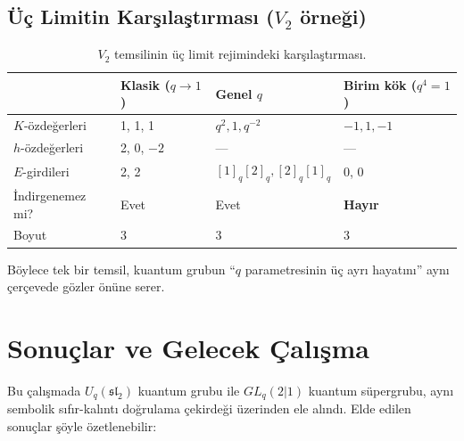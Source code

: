 \documentclass[10pt]{math}
\numberwithin{equation}{section}
\theoremstyle{plain}
\theoremstyle{definition}
\renewcommand{\sl}{\mathfrak{sl}}
\newcommand{\Uq}{U_q(\sl_2)}
\newcommand{\qint}[1]{[#1]_q}
\begin{document}
\subsection{Üç Limitin Karşılaştırması ($V_2$ örneği)}

\begin{table}[h]
\centering
\small
\caption{$V_2$ temsilinin üç limit rejimindeki karşılaştırması.}
\label{tab:limits}
\begin{tabularx}{\textwidth}{@{}lXXX@{}}
\toprule
& Klasik ($q \to 1$) & Genel $q$ & Birim kök ($q^4 = 1$) \\
\midrule
$K$-özdeğerleri & 1, 1, 1 & $q^2, 1, q^{-2}$ & $-1, 1, -1$ \\
$h$-özdeğerleri & 2, 0, $-2$ & --- & --- \\
$E$-girdileri & 2, 2 & $\qint{1}\qint{2}, \qint{2}\qint{1}$ & 0, 0 \\
İndirgenemez mi? & Evet & Evet & \textbf{Hayır} \\
Boyut & 3 & 3 & 3 \\
\bottomrule
\end{tabularx}
\end{table}

Böylece tek bir temsil, kuantum grubun ``$q$ parametresinin üç ayrı hayatını''
aynı çerçevede gözler önüne serer.

\section{Sonuçlar ve Gelecek Çalışma}

Bu çalışmada $\Uq$ kuantum grubu ile $GL_q(2|1)$ kuantum süpergrubu, aynı
sembolik sıfır-kalıntı doğrulama çekirdeği üzerinden ele alındı. Elde edilen
sonuçlar şöyle özetlenebilir:
\end{document}
